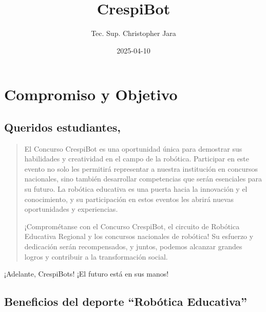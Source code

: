 \documentclass[
  letterpaper,
  DIV=11,
  numbers=noendperiod]{scrreprt}
\title{CrespiBot}
\author{Tec. Sup. Christopher Jara}
\date{2025-04-10}
\renewcommand*\contentsname{Table of contents}
\newcommand\contentsname{Table of contents}
\begin{document}
\maketitle

\renewcommand*\contentsname{Table of contents}
{
\hypersetup{linkcolor=}
\setcounter{tocdepth}{2}
\tableofcontents
}


\chapter*{Compromiso y Objetivo}\label{compromiso-y-objetivo}


\section*{Queridos estudiantes,}\label{queridos-estudiantes}


\begin{quote}
El Concurso CrespiBot es una oportunidad única para demostrar sus
habilidades y creatividad en el campo de la robótica. Participar en este
evento no solo les permitirá representar a nuestra institución en
concursos nacionales, sino también desarrollar competencias que serán
esenciales para su futuro. La robótica educativa es una puerta hacia la
innovación y el conocimiento, y su participación en estos eventos les
abrirá nuevas oportunidades y experiencias.

¡Comprométanse con el Concurso CrespiBot, el circuito de Robótica
Educativa Regional y los concursos nacionales de robótica! Su esfuerzo y
dedicación serán recompensados, y juntos, podemos alcanzar grandes
logros y contribuir a la transformación social.
\end{quote}

¡Adelante, CrespiBots! ¡El futuro está en sus manos!

\section*{Beneficios del deporte ``Robótica
Educativa''}\label{beneficios-del-deporte-robuxf3tica-educativa}
\end{document}

